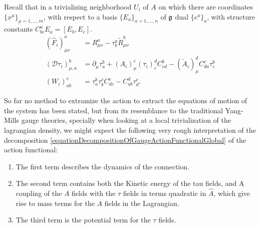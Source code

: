 Recall that in a trivializing neighborhood $U_i$ of $A$ on which there are coordinates $\{x^\mu\}_{\mu = 1, \dots, m}$, with respect to a basis $\{E_a\}_{a = 1, \dots, n}$ of $\mathfrak{g}$ dual $\{e^a\}_a$, with structure constants $C^a_{bc} E_a = [E_b, E_c]$. 
\begin{align}
    (\hat F_i)^a_{\mu \nu} &= R^a_{\mu \nu} - \tau^a_b \tilde R^b_{\mu \nu}\\
    (\mathcal D \tau_i)^b_{\mu, a} &= \partial_\mu \tau^b_a + (A_i)^c_\mu (\tau_i)^d_c C^b_{cd} - (\tilde A_i)_\mu^d C^c_{da} \tau^b_c\\
    (W_i)^c_{ab} &= \tau^b_a \tau^e_b C^c_{de} - C^d_{ab}\tau^c_d.
\end{align}

So far no method to extramize the action to extract the equations of motion of the system has been stated, but from its resemblance to the traditional Yang-Mills gauge theories, specially when looking at a local trivialization of the lagrangian density, we might expect the following very rough interpretation of the decomposition \eqref{equationDecompositionOfGaugeActionFunctionalGlobal} of the action functional:
\begin{enumerate}
    \item The first term describes the dynamics of the connection. 
    
    \item The second term contains both the Kinetic energy of the tau fields, and A coupling of the $A$ fields with the $\tau$ fields in terms quadratic in $\hat A$, which give rise to mass terms for the $A$ fields in the Lagrangian.
    
    \item The third term is the potential term for the $\tau$ fields.
\end{enumerate}

